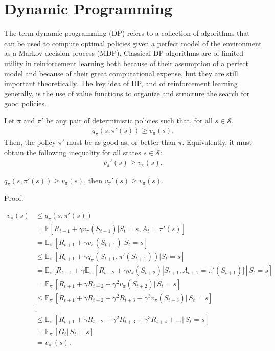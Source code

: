 \chapter{Dynamic Programming}
The term dynamic programming (DP) refers to a collection of algorithms that can be used to compute optimal policies given a perfect model of the environment as a Markov decision process (MDP). Classical DP algorithms are of limited utility in reinforcement learning both because of their assumption of a perfect model and because of their great computational expense, but they are still important theoretically. The key idea of DP, and of reinforcement learning generally, is the use of value functions to organize and structure the search for good policies.


Let $\pi$ and $\pi'$ be any pair of deterministic policies such that, for all $s\in \mathcal{S}$, 
\begin{align*}
	q_\pi(s, \pi'(s))\geq v_\pi(s).	
\end{align*}
Then, the policy $\pi'$ must be as good as, or better than $\pi$. Equivalently, it must obtain the following inequality for all states $s\in \mathcal{S}$:
\begin{align*}
	v_\pi'(s)\geq v_\pi(s).	
\end{align*}

\begin{theorem}
	$q_\pi(s, \pi'(s))\geq v_\pi(s)$, then $v_\pi'(s)\geq v_\pi(s)$.	
	\label{thrm:policy_improvement}
\end{theorem}
Proof.

\begin{align*}
	v_\pi(s)&\leq q_\pi(s, \pi'(s))	\\
	&= \mathbb{E}[R_{t+1}+\gamma v_\pi(S_{t+1})|S_t=s, A_t=\pi'(s)]\\
	&= \mathbb{E}_{\pi'}[R_{t+1}+\gamma v_\pi(S_{t+1})|S_t=s]\\
	&\leq \mathbb{E}_{\pi'}[R_{t+1}+\gamma q_\pi(S_{t+1}, \pi'(S_{t+1}))|S_t=s]\\
	&= \mathbb{E}_{\pi'}[R_{t+1}+\gamma \mathbb{E}_{\pi'}[R_{t+2}+\gamma v_\pi(S_{t+2})|S_{t+1}, A_{t+1}=\pi'(S_{t+1})]\,|\,S_t=s]\\
	&= \mathbb{E}_{\pi'}[R_{t+1}+\gamma R_{t+2}+\gamma^2 v_\pi(S_{t+2})|\,S_t=s]\\
	&\leq \mathbb{E}_{\pi'}[R_{t+1}+\gamma R_{t+2}+\gamma^2 R_{t+3}+\gamma^3 v_\pi(S_{t+3})|\,S_t=s]\\
	&\vdots\\
	&\leq \mathbb{E}_{\pi'}[R_{t+1}+\gamma R_{t+2}+\gamma^2 R_{t+3}+\gamma^3 R_{t+4}+\ldots|\,S_t=s]\\
	&= \mathbb{E}_{\pi'}[G_t|\,S_t=s]\\
	&= v_{\pi'}(s).
\end{align*}


